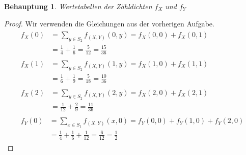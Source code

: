\documentclass[a4paper]{scrartcl}
\newtheorem*{behaupt}{Behauptung}
\begin{document}
\begin{enumerate}[label=\bfseries\arabic*.]
\begin{enumerate}[label=(\alph*)]
\begin{enumerate}[label=(\alph{enumi}.\arabic*)]
\begin{behaupt}
\begin{table}[H]
                                \caption{Wertetabellen der Zähldichten $f_X$ und
                                    $f_Y$}
                                \label{tab:zdichten-fx-fy}
                            \end{table}
                        \end{behaupt}
                        \begin{proof}
                            Wir verwenden die Gleichungen aus der vorherigen
                            Aufgabe.
                            \begin{align*}
                                \begin{split}
                                    f_X(0) &= \sum_{y \in S_2} f_{(X, Y)}(0, y)
                                    = f_X(0, 0) + f_X(0, 1) \\
                                    &= \frac{1}{4} + \frac{1}{6}
                                    = \frac{5}{12} = \frac{15}{36}
                                \end{split} \\
                                \begin{split}
                                    f_X(1) &= \sum_{y \in S_2} f_{(X, Y)}(1, y)
                                    = f_X(1, 0) + f_X(1, 1) \\
                                    &= \frac{1}{6} + \frac{1}{9}
                                    = \frac{5}{18} = \frac{10}{36}
                                \end{split} \\
                                \begin{split}
                                    f_X(2) &= \sum_{y \in S_2} f_{(X, Y)}(2, y)
                                    = f_X(2, 0) + f_X(2, 1) \\
                                    &= \frac{1}{12} + \frac{2}{9}
                                    = \frac{11}{36}
                                \end{split} \\
                                \begin{split}
                                    f_Y(0) &= \sum_{x \in S_1} f_{(X, Y)}(x, 0)
                                    = f_Y(0, 0) + f_Y(1, 0) + f_Y(2, 0) \\
                                    &= \frac{1}{4} + \frac{1}{6} + \frac{1}{12}
                                    = \frac{6}{12} = \frac{1}{2}

\end{split}
\end{align*}
\end{proof}
\end{enumerate}
\end{enumerate}
\end{enumerate}
\end{document}
